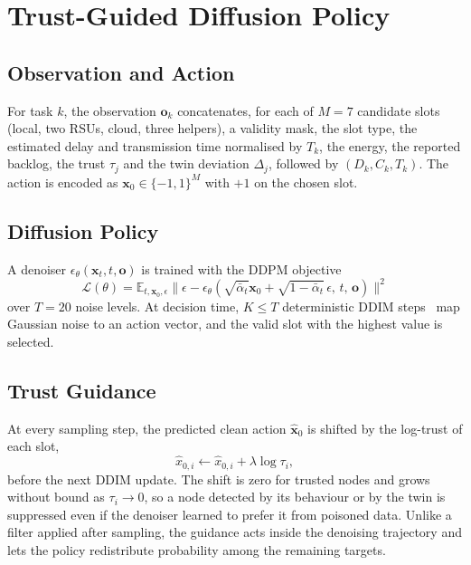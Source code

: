 \documentclass[journal]{IEEEtran}
\begin{document}
\section{Trust-Guided Diffusion Policy}\label{sec:method}

\subsection{Observation and Action}
For task $k$, the observation $\mathbf{o}_k$ concatenates, for each of $M=7$ candidate slots (local, two RSUs, cloud, three helpers), a validity mask, the slot type, the estimated delay and transmission time normalised by $T_k$, the energy, the reported backlog, the trust $\tau_j$ and the twin deviation $\Delta_j$, followed by $(D_k, C_k, T_k)$. The action is encoded as $\mathbf{x}_0\in\{-1,1\}^M$ with $+1$ on the chosen slot.

\subsection{Diffusion Policy}
A denoiser $\epsilon_\theta(\mathbf{x}_t, t, \mathbf{o})$ is trained with the DDPM objective~\cite{ho2020ddpm}
\begin{equation}
\mathcal{L}(\theta)=\mathbb{E}_{t,\mathbf{x}_0,\epsilon}\big\|\epsilon-\epsilon_\theta(\sqrt{\bar\alpha_t}\mathbf{x}_0+\sqrt{1-\bar\alpha_t}\,\epsilon,\,t,\,\mathbf{o})\big\|^2
\end{equation}
over $T=20$ noise levels. At decision time, $K\le T$ deterministic DDIM steps~\cite{song2021ddim} map Gaussian noise to an action vector, and the valid slot with the highest value is selected.

\subsection{Trust Guidance}
At every sampling step, the predicted clean action $\hat{\mathbf{x}}_0$ is shifted by the log-trust of each slot,
\begin{equation}
\hat{x}_{0,i} \leftarrow \hat{x}_{0,i} + \lambda \log \tau_i,
\end{equation}
before the next DDIM update. The shift is zero for trusted nodes and grows without bound as $\tau_i\to 0$, so a node detected by its behaviour or by the twin is suppressed even if the denoiser learned to prefer it from poisoned data. Unlike a filter applied after sampling, the guidance acts inside the denoising trajectory and lets the policy redistribute probability among the remaining targets.
\end{document}
